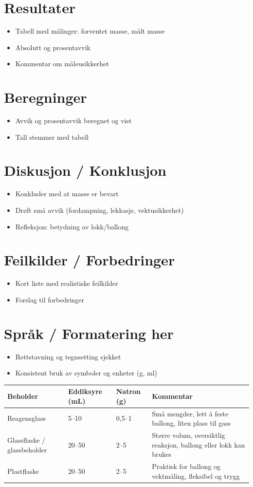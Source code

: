 \documentclass[a4paper,12pt]{article}
\begin{document}
\section*{Resultater}
\begin{itemize}
    \item Tabell med målinger: forventet masse, målt masse
    \item Absolutt og prosentavvik
    \item Kommentar om måleusikkerhet
\end{itemize}

\section*{Beregninger}
\begin{itemize}
    \item Avvik og prosentavvik beregnet og vist
    \item Tall stemmer med tabell
\end{itemize}

\section*{Diskusjon / Konklusjon}
\begin{itemize}
    \item Konkluder med at masse er bevart
    \item Drøft små avvik (fordampning, lekkasje, vektusikkerhet)
    \item Refleksjon: betydning av lokk/ballong
\end{itemize}

\section*{Feilkilder / Forbedringer}
\begin{itemize}
    \item Kort liste med realistiske feilkilder
    \item Forslag til forbedringer
\end{itemize}

\section*{Språk / Formatering her}
\begin{itemize}
    \item Rettstavning og tegnsetting sjekket
    \item Konsistent bruk av symboler og enheter (g, ml)
\end{itemize}
\begin{tabular}{l l l p{3cm}}
\toprule
\textbf{Beholder} & \textbf{Eddiksyre (mL)} & \textbf{Natron (g)} & \textbf{Kommentar} \\
\midrule
Reagensglass & 5--10 & 0,5--1 & Små mengder, lett å feste ballong, liten plass til gass \\
Glassflaske / glassbeholder & 20--50 & 2--5 & Større volum, oversiktlig reaksjon, ballong eller lokk kan brukes \\
Plastflaske & 20--50 & 2--5 & Praktisk for ballong og vektmåling, fleksibel og trygg \\
\bottomrule
\end{tabular}
\end{document}
